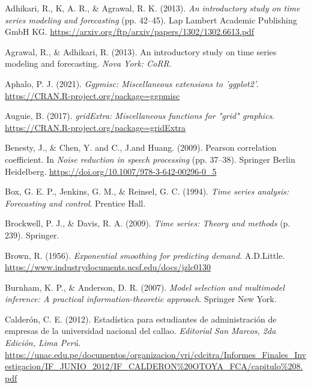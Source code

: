 \documentclass[
]{article}
\newlength{\cslhangindent}
\newlength{\cslentryspacingunit} %
\newenvironment{CSLReferences}[2] %
 {%
  \setlength{\parindent}{0pt}
  \ifodd #1
  \let\oldpar\par
  \def\par{\hangindent=\cslhangindent\oldpar}
  \fi
  \setlength{\parskip}{#2\cslentryspacingunit}
 }%
 {}
\begin{document}
\hypertarget{refs}{}
\begin{CSLReferences}{1}{0}
\leavevmode{}%
Adhikari, R., K, A. R., \& Agrawal, R. K. (2013). \emph{An introductory
study on time series modeling and forecasting} (pp. 42--45). Lap Lambert
Academic Publishing GmbH KG.
\url{https://arxiv.org/ftp/arxiv/papers/1302/1302.6613.pdf}

\leavevmode{}%
Agrawal, R., \& Adhikari, R. (2013). An introductory study on time
series modeling and forecasting. \emph{Nova York: CoRR}.

\leavevmode{}%
Aphalo, P. J. (2021). \emph{Ggpmisc: Miscellaneous extensions to
'ggplot2'}. \url{https://CRAN.R-project.org/package=ggpmisc}

\leavevmode{}%
Auguie, B. (2017). \emph{gridExtra: Miscellaneous functions for "grid"
graphics}. \url{https://CRAN.R-project.org/package=gridExtra}

\leavevmode{}%
Benesty, J., \& Chen, Y. and C., J.and Huang. (2009). Pearson
correlation coefficient. In \emph{Noise reduction in speech processing}
(pp. 37--38). Springer Berlin Heidelberg.
\url{https://doi.org/10.1007/978-3-642-00296-0_5}

\leavevmode{}%
Box, G. E. P., Jenkins, G. M., \& Reinsel, G. C. (1994). \emph{Time
series analysis: Forecasting and control}. Prentice Hall.

\leavevmode{}%
Brockwell, P. J., \& Davis, R. A. (2009). \emph{Time series: Theory and
methods} (p. 239). Springer.

\leavevmode{}%
Brown, R. (1956). \emph{Exponential smoothing for predicting demand}.
A.D.Little. \url{https://www.industrydocuments.ucsf.edu/docs/jzlc0130}

\leavevmode{}%
Burnham, K. P., \& Anderson, D. R. (2007). \emph{Model selection and
multimodel inference: A practical information-theoretic approach}.
Springer New York.

\leavevmode{}%
Calderón, C. E. (2012). Estadística para estudiantes de administración
de empresas de la universidad nacional del callao. \emph{Editorial San
Marcos, 2da Edición, Lima Perú}.
\url{https://unac.edu.pe/documentos/organizacion/vri/cdcitra/Informes_Finales_Investigacion/IF_JUNIO_2012/IF_CALDERON\%20OTOYA_FCA/capitulo\%208.pdf}


\end{CSLReferences}
\end{document}
